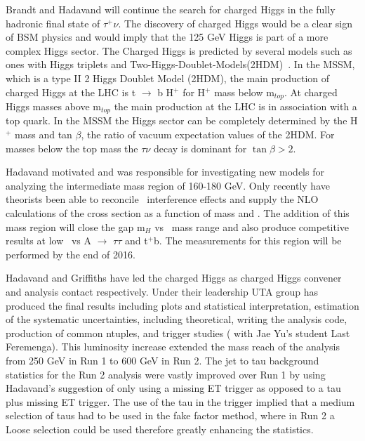 \label{charged-Higgs}
Brandt and Hadavand will continue the search for charged Higgs in the fully hadronic final state of $\tau^+ \nu$.  The discovery of charged Higgs  would be a clear sign of BSM physics 
and would imply that the 125 GeV Higgs is part of a more complex Higgs sector. 
The Charged Higgs is predicted by several models such as ones with Higgs triplets and Two-Higgs-Doublet-Models(2HDM)~\cite{2hdm1,2hdm2,2hdm3}. 
In the MSSM, which is a type II 2 Higgs Doublet Model (2HDM), the main production of charged Higgs at the LHC is t $\rightarrow$ b H$^+$ for H$^+$ mass below m$_{top}$. At charged Higgs masses above m$_{top}$
the main production at the LHC is in association with a top quark.  In the MSSM the Higgs sector can be completely determined by the H$^+$ mass and tan $\beta$, the ratio of vacuum expectation values of the 2HDM.
For masses below the top mass the $\tau \nu$ decay is dominant for $\tan \beta >2 $. 


Hadavand motivated and was responsible for investigating new models for analyzing the intermediate mass region of 160-180 GeV.
Only recently have theorists been able to reconcile \ttbar\ interference effects and supply the NLO calculations of the cross section as a function of mass and \tanb.
The addition of this mass region will close the gap m$_{H}$ vs \tanb\ mass range and also produce competitive results at low \tanb\ vs A $\rightarrow$ $\tau \tau$ and \Hp \too t$^+$b.  
The measurements for this region will be performed by the end of 2016.

Hadavand and Griffiths have led the charged Higgs as charged Higgs convener and analysis contact respectively.  Under their leadership UTA group has produced the final results including plots and statistical
interpretation, estimation of the systematic uncertainties, including theoretical, writing the analysis code, production of common ntuples, and trigger studies ( with Jae Yu's student Last Feremenga).  
This luminosity increase extended the mass reach of the analysis from 250 GeV in Run 1 to 600 GeV in Run 2.
The jet to tau background statistics for the Run 2 analysis were vastly improved over Run 1 by using Hadavand's suggestion of only using a missing ET trigger as opposed to a tau plus missing ET trigger.  The use of the tau in the trigger implied that a medium selection of taus had to be used in the fake factor method, 
where in Run 2 a Loose selection could be used therefore greatly enhancing the statistics.

